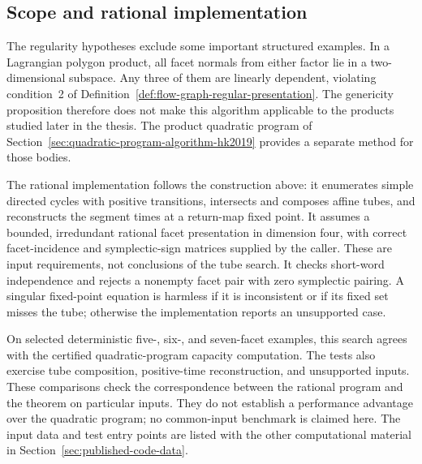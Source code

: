 \subsection{Scope and rational implementation}
\label{subsec:flow-graph-algorithm-ch2021-implementation}

The regularity hypotheses exclude some important structured examples.
In a Lagrangian polygon product, all facet normals from either factor lie in a
two-dimensional subspace.  Any three of them are linearly dependent, violating
condition~2 of Definition~\ref{def:flow-graph-regular-presentation}.
The genericity proposition therefore does not make this algorithm applicable
to the products studied later in the thesis.  The product quadratic program
of Section~\ref{sec:quadratic-program-algorithm-hk2019} provides a separate method
for those bodies.

The rational implementation follows the construction above: it enumerates
simple directed cycles with positive transitions, intersects and composes
affine tubes, and reconstructs the segment times at a return-map fixed point.
It assumes a bounded, irredundant rational facet presentation in dimension
four, with correct facet-incidence and symplectic-sign matrices supplied by
the caller.  These are input requirements, not conclusions of the tube search.
It checks short-word independence and rejects a nonempty facet pair with zero
symplectic pairing.  A singular fixed-point equation is harmless if it is
inconsistent or if its fixed set misses the tube; otherwise the implementation
reports an unsupported case.

On selected deterministic five-, six-, and seven-facet examples, this search
agrees with the certified quadratic-program capacity computation.  The tests
also exercise tube composition, positive-time reconstruction, and unsupported
inputs.  These comparisons check the correspondence between the rational
program and the theorem on particular inputs.  They do not establish a
performance advantage over the quadratic program; no common-input benchmark
is claimed here.  The input data and test entry points are listed with the
other computational material in Section~\ref{sec:published-code-data}.
